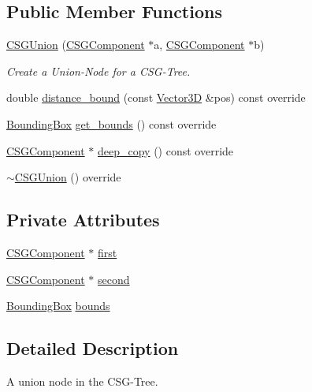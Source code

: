 \subsection*{Public Member Functions}
\begin{DoxyCompactItemize}
\item 
\mbox{\hyperlink{classCSGUnion_a89f33aab1b6e073a2813f97cc3998fc7}{C\+S\+G\+Union}} (\mbox{\hyperlink{classCSGComponent}{C\+S\+G\+Component}} $\ast$a, \mbox{\hyperlink{classCSGComponent}{C\+S\+G\+Component}} $\ast$b)
\begin{DoxyCompactList}\small\item\em Create a Union-\/\+Node for a C\+S\+G-\/\+Tree. \end{DoxyCompactList}\item 
double \mbox{\hyperlink{classCSGUnion_a2a15937802a57a3a78b84961fc0dda9f}{distance\+\_\+bound}} (const \mbox{\hyperlink{classVector3D}{Vector3D}} \&pos) const override
\item 
\mbox{\hyperlink{classBoundingBox}{Bounding\+Box}} \mbox{\hyperlink{classCSGUnion_aaf1d2e77d8f931327fd8c499933142ba}{get\+\_\+bounds}} () const override
\item 
\mbox{\hyperlink{classCSGComponent}{C\+S\+G\+Component}} $\ast$ \mbox{\hyperlink{classCSGUnion_a806fa004753847d293e56a93112abe9a}{deep\+\_\+copy}} () const override
\item 
\mbox{\hyperlink{classCSGUnion_af16ab807f0e1140de88007a5606f2a91}{$\sim$\+C\+S\+G\+Union}} () override
\end{DoxyCompactItemize}
\subsection*{Private Attributes}
\begin{DoxyCompactItemize}
\item 
\mbox{\hyperlink{classCSGComponent}{C\+S\+G\+Component}} $\ast$ \mbox{\hyperlink{classCSGUnion_ac2042150362043f8646dc9f13e98df1a}{first}}
\item 
\mbox{\hyperlink{classCSGComponent}{C\+S\+G\+Component}} $\ast$ \mbox{\hyperlink{classCSGUnion_abb2099a585c204bdcf3c2d0c8004438e}{second}}
\item 
\mbox{\hyperlink{classBoundingBox}{Bounding\+Box}} \mbox{\hyperlink{classCSGUnion_a40b5e5f99930721873da62db801e0c90}{bounds}}
\end{DoxyCompactItemize}


\subsection{Detailed Description}
A union node in the C\+S\+G-\/\+Tree. 

